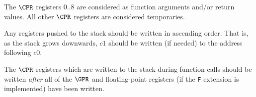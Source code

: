 The $\CPR$ registers $0..8$ are considered as function arguments
and/or return values. 
All other $\CPR$ registers are considered temporaries.

Any registers pushed to the stack should be written in ascending order.
That is, as the stack grows downwards, $c1$ should be written (if needed)
to the address following $c0$.

The $\CPR$ registers which are written to the stack during function calls
should be written {\em after} all of the $\GPR$ and floating-point registers
(if the {\tt F} extension is implemented) have been written.

